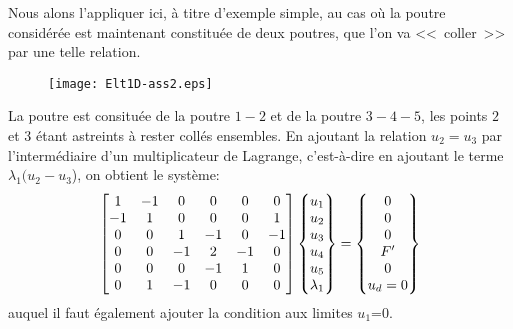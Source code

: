 \medskip
Nous alons l'appliquer ici, à titre d'exemple simple, au cas où la poutre considérée est maintenant constituée de deux poutres, que l'on va <<~coller~>> par une telle relation.
\begin{figure}[ht]
\centering
\texttt{[image: Elt1D-ass2.eps]}
\end{figure}
La poutre est consituée de la poutre $1-2$ et de la poutre $3-4-5$, les points $2$ et $3$ étant astreints à rester collés ensembles.
\medskipvm
En ajoutant la relation $u_2=u_3$ par l'intermédiaire d'un multiplicateur de Lagrange, c'est-à-dire en ajoutant le terme $\lambda_1(u_2-u_3$), on obtient le système:
\begin{equation}
\MM*{1&-1&0&0&0&0 \\ -1&1&0&0&0&1 \\ 0&0&1&-1&0&-1\\ 0&0&-1&2&-1&0\\ 0&0&0&-1&1&0 \\ 0&1&-1&0&0&0}
\VV*{u_1\\u_2\\u_3\\u_4\\ u_5\\ \lambda_1}
=
\VV*{0\\0\\0\\F' \\ 0 \\ u_d=0}
\end{equation}
auquel il faut également ajouter la condition aux limites $u_1$=0.

